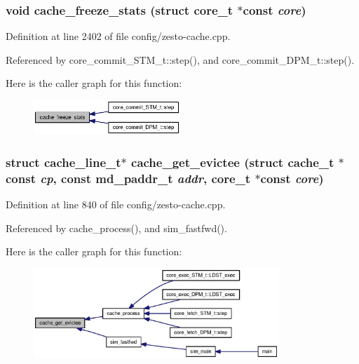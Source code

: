 \subsubsection[{cache\_\-freeze\_\-stats}]{\setlength{\rightskip}{0pt plus 5cm}void cache\_\-freeze\_\-stats (struct {\bf core\_\-t} $\ast$const  {\em core})}\label{config_2zesto-cache_8cpp_bd1fe8334f2259dc773b85f98c7fbcfa}




Definition at line 2402 of file config/zesto-cache.cpp.

Referenced by core\_\-commit\_\-STM\_\-t::step(), and core\_\-commit\_\-DPM\_\-t::step().

Here is the caller graph for this function:\nopagebreak
\begin{figure}[H]
\begin{center}
\leavevmode
\includegraphics[width=157pt]{config_2zesto-cache_8cpp_bd1fe8334f2259dc773b85f98c7fbcfa_icgraph}
\end{center}
\end{figure}
\subsubsection[{cache\_\-get\_\-evictee}]{\setlength{\rightskip}{0pt plus 5cm}struct {\bf cache\_\-line\_\-t}$\ast$ cache\_\-get\_\-evictee (struct {\bf cache\_\-t} $\ast$const  {\em cp}, \/  const {\bf md\_\-paddr\_\-t} {\em addr}, \/  {\bf core\_\-t} $\ast$const  {\em core})\hspace{0.3cm}{\tt  [read]}}\label{config_2zesto-cache_8cpp_64ef5d6d0aef624c6534b1aae0416f96}




Definition at line 840 of file config/zesto-cache.cpp.

Referenced by cache\_\-process(), and sim\_\-fastfwd().

Here is the caller graph for this function:\nopagebreak
\begin{figure}[H]
\begin{center}
\leavevmode
\includegraphics[width=262pt]{config_2zesto-cache_8cpp_64ef5d6d0aef624c6534b1aae0416f96_icgraph}
\end{center}
\end{figure}
